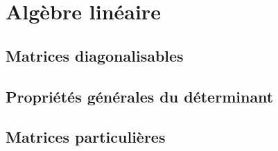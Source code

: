 \section{Algèbre linéaire} 
\newcommand{\alglin}{/home/robin/ENSEIGN/Cours/MathBiologie/L3-ENS-Math1/Exercices/AlgLin}

\subsection{Matrices diagonalisables}%

% 





\subsection{Propriétés générales du déterminant}%





\subsection{Matrices particulières}%

% 


